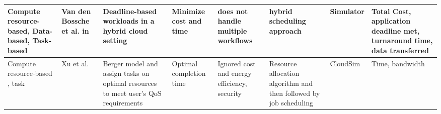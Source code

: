 \begin{sidewaystable*}[!htbp]
{\begin{tabular}{|g{2cm} p{1.9cm} p{2cm} p{2cm} p{2cm} p{2cm} p{2cm} p{2cm}|}
 Compute resource-based, Data-based, Task-based & Van den Bossche et al. in~\cite{vandenbosshe2013} & Deadline-based workloads in a hybrid cloud setting & Minimize cost and time & does not handle multiple workflows & hybrid scheduling approach & Simulator & Total Cost, application deadline met, turnaround time, data transferred
\\ \hline

Compute resource-based , task & Xu et al.~\cite{xu2011job} & Berger model and assign tasks on optimal resources to meet user's QoS requirements & Optimal completion time & Ignored cost and energy efficiency, security& Resource allocation algorithm and then followed by job scheduling & CloudSim & Time, bandwidth
\\ \hline


\end{tabular}
}
\end{sidewaystable*}
